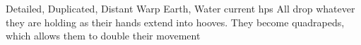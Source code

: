   {Detailed, Duplicated, Distant}%
  {Warp}%
  {Earth, Water}%
  {current \glspl{hp}}%
  {All  drop whatever they are holding as their hands extend into hooves.  They become quadrapeds, which allows them to double their movement}%
  {}
